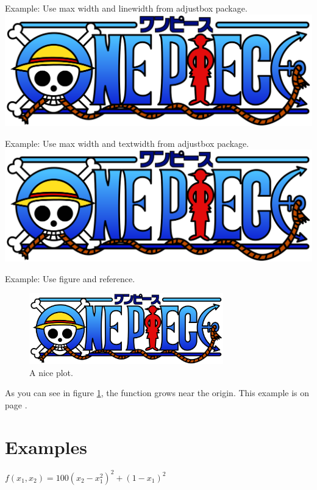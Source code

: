 \documentclass[letterpaper, oneside]{book}
\begin{document}
	Example: Use max width and linewidth from adjustbox package. \\
	\includegraphics[max width=\linewidth]{One_Piece_Logo.png}

	Example: Use max width and textwidth from adjustbox package. \\
	\includegraphics[max width=\textwidth]{One_Piece_Logo.png}

	Example: Use figure and reference.
	\begin{figure}[h]
		\centering
		\includegraphics[width=0.75\textwidth]{One_Piece_Logo.png}
		\caption{A nice plot.}
		\label{fig:mesh1}
	\end{figure}

	As you can see in figure \ref{fig:mesh1}, the function grows near the origin. This example is on page \pageref{fig:mesh1}.




	
	
	

	
	
	
\chapter{Examples}

\begin{math}
	f(x_1, x_2) = 100 (x_2 - x_{1}^2)^2 + (1 - x_1)^2
\end{math}
\end{document}
